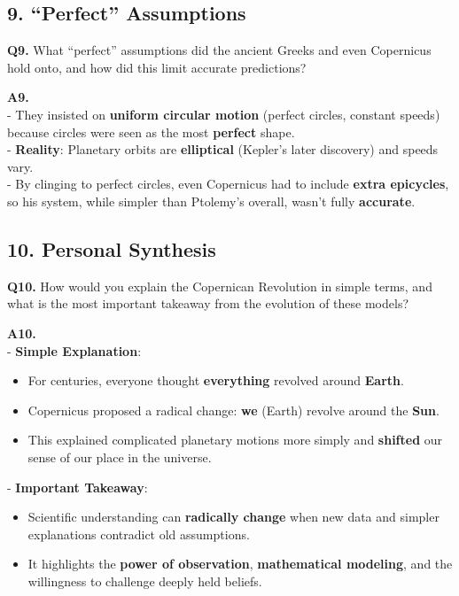 \subsection*{9. ``Perfect'' Assumptions}

\textbf{Q9.} What ``perfect'' assumptions did the ancient Greeks and even Copernicus hold onto, and how did this limit accurate predictions?

\textbf{A9.}\\
- They insisted on \textbf{uniform circular motion} (perfect circles, constant speeds) because circles were seen as the most \textbf{perfect} shape.\\
- \textbf{Reality}: Planetary orbits are \textbf{elliptical} (Kepler’s later discovery) and speeds vary.\\
- By clinging to perfect circles, even Copernicus had to include \textbf{extra epicycles}, so his system, while simpler than Ptolemy’s overall, wasn’t fully \textbf{accurate}.

\subsection*{10. Personal Synthesis}

\textbf{Q10.} How would you explain the Copernican Revolution in simple terms, and what is the most important takeaway from the evolution of these models?

\textbf{A10.}\\
- \textbf{Simple Explanation}:
  \begin{itemize}
    \item For centuries, everyone thought \textbf{everything} revolved around \textbf{Earth}.
    \item Copernicus proposed a radical change: \textbf{we} (Earth) revolve around the \textbf{Sun}.
    \item This explained complicated planetary motions more simply and \textbf{shifted} our sense of our place in the universe.
  \end{itemize}
- \textbf{Important Takeaway}:
  \begin{itemize}
    \item Scientific understanding can \textbf{radically change} when new data and simpler explanations contradict old assumptions.
    \item It highlights the \textbf{power of observation}, \textbf{mathematical modeling}, and the willingness to challenge deeply held beliefs.
  \end{itemize}

